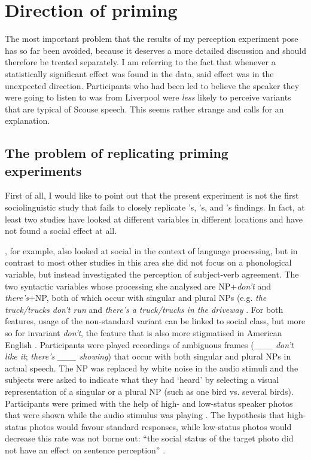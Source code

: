 	\section{Direction of priming}
		\label{sec.perc_res.disc.direction}

The most important problem that the results of my perception experiment pose has so far been avoided, because it deserves a more detailed discussion and should therefore be treated separately.
I am referring to the fact that whenever a statistically significant  effect was found in the data, said effect was in the unexpected direction.
Participants who had been led to believe the speaker they were going to listen to was from Liverpool were \emph{less} likely to perceive variants that are typical of Scouse speech.
This seems rather strange and calls for an explanation.

		\subsection{The problem of replicating priming experiments}

First of all, I would like to point out that the present experiment is not the first sociolinguistic study that fails to closely replicate \citeauthor{niedzielski1999}'s, \citeauthor{hayetal2006a}'s, and \citeauthor{haydrager2010}'s findings.
In fact, at least two studies have looked at different variables in different locations and have not found a social  effect at all.

\citeauthor{squires2013}, for example, also looked at social  in the context of language processing, but in contrast to most other studies in this area she did not focus on a phonological variable, but instead investigated the perception of subject-verb agreement.
The two syntactic variables whose processing she analysed are NP+\emph{don't} and \emph{there's}+NP, both of which occur with singular and plural NPs (e.g. \emph{the truck/trucks don't run} and \emph{there's a truck/trucks in the driveway} \parencite[cf.][206]{squires2013}.
For both features, usage of the non-standard variant can be linked to social class, but more so for invariant \emph{don't}, the feature that is also more stigmatised in American English \parencite[cf.][207--208]{squires2013}.
Participants were played recordings of ambiguous frames (\emph{\_\_\_ don't like it}; \emph{there's \_\_\_ showing}) that occur with both singular and plural NPs in actual speech.
The NP was replaced by white noise in the audio stimuli and the subjects were asked to indicate what they had `heard' by selecting a visual representation of a singular or a plural NP (such as one bird vs. several birds).
Participants were primed with the help of high- and low-status speaker photos that were shown while the audio stimulus was playing \parencite[cf.][210--211]{squires2013}.
The hypothesis that high-status photos would favour standard responses, while low-status photos would decrease this rate was not borne out: ``the social status of the target photo did not have an effect on sentence perception'' \parencite[216]{squires2013}.

